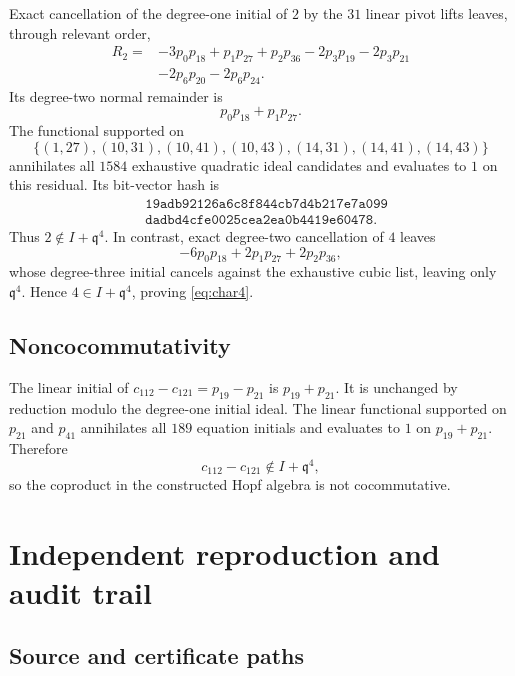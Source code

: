 \documentclass[11pt]{article}
\theoremstyle{remark}
\newcommand{\q}{\mathfrak q}
\begin{document}
Exact cancellation of the degree-one initial of \(2\) by the \(31\) linear
pivot lifts leaves, through relevant order,
\begin{align*}
R_2={}&-3p_0p_{18}+p_1p_{27}+p_2p_{36}
 -2p_3p_{19}-2p_3p_{21}\\
&-2p_6p_{20}-2p_6p_{24}.
\end{align*}
Its degree-two normal remainder is
\[
  p_0p_{18}+p_1p_{27}.
\]
The functional supported on
\[
 \{(1,27),(10,31),(10,41),(10,43),
   (14,31),(14,41),(14,43)\}
\]
annihilates all \(1584\) exhaustive quadratic ideal candidates and evaluates
to \(1\) on this residual.  Its bit-vector hash is
\[
\begin{split}
&\texttt{19adb92126a6c8f844cb7d4b217e7a099}\\
&\texttt{dadbd4cfe0025cea2ea0b4419e60478}.
\end{split}
\]
Thus \(2\notin I+\q^4\).  In contrast, exact degree-two cancellation of
\(4\) leaves
\[
 -6p_0p_{18}+2p_1p_{27}+2p_2p_{36},
\]
whose degree-three initial cancels against the exhaustive cubic list, leaving
only \(\q^4\).  Hence \(4\in I+\q^4\), proving \eqref{eq:char4}.

\subsection{Noncocommutativity}

The linear initial of \(c_{112}-c_{121}=p_{19}-p_{21}\) is
\(p_{19}+p_{21}\).  It is unchanged by reduction modulo the degree-one
initial ideal.  The linear functional supported on \(p_{21}\) and \(p_{41}\)
annihilates all \(189\) equation initials and evaluates to \(1\) on
\(p_{19}+p_{21}\).  Therefore
\[
  c_{112}-c_{121}\notin I+\q^4,
\]
so the coproduct in the constructed Hopf algebra is not cocommutative.

\section{Independent reproduction and audit trail}

\subsection{Source and certificate paths}
\end{document}
